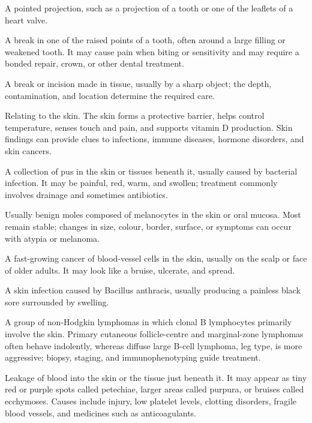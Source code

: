  A pointed projection, such as a projection of a tooth or one of the leaflets of a heart valve.

 A break in one of the raised points of a tooth, often around a large filling or weakened tooth. It may cause pain when biting or sensitivity and may require a bonded repair, crown, or other dental treatment.

 A break or incision made in tissue, usually by a sharp object; the depth, contamination, and location determine the required care.

 Relating to the skin. The skin forms a protective barrier, helps control temperature, senses touch and pain, and supports vitamin D production. Skin findings can provide clues to infections, immune diseases, hormone disorders, and skin cancers.

 A collection of pus in the skin or tissues beneath it, usually caused by bacterial infection. It may be painful, red, warm, and swollen; treatment commonly involves drainage and sometimes antibiotics.

 Usually benign moles composed of melanocytes in the skin or oral mucosa. Most remain stable; changes in size, colour, border, surface, or symptoms can occur with atypia or melanoma.

 A fast-growing cancer of blood-vessel cells in the skin, usually on the scalp or face of older adults. It may look like a bruise, ulcerate, and spread.

 A skin infection caused by Bacillus anthracis, usually producing a painless black sore surrounded by swelling.

 A group of non-Hodgkin lymphomas in which clonal B lymphocytes primarily involve the skin. Primary cutaneous follicle-centre and marginal-zone lymphomas often behave indolently, whereas diffuse large B-cell lymphoma, leg type, is more aggressive; biopsy, staging, and immunophenotyping guide treatment.

 Leakage of blood into the skin or the tissue just beneath it. It may appear as tiny red or purple spots called petechiae, larger areas called purpura, or bruises called ecchymoses. Causes include injury, low platelet levels, clotting disorders, fragile blood vessels, and medicines such as anticoagulants.

